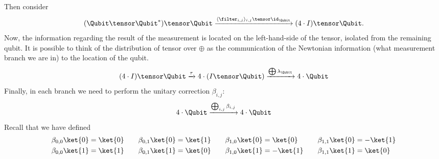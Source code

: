 Then consider
\[  (\Qubit \tensor \Qubit^*) \tensor \Qubit
    \xrightarrow{\langle \filter_{i,j} \rangle_{i,j} \tensor \id_\Qubit} 
    (4 \cdot I) \tensor \Qubit. 
\]
Now, the information regarding the result of the measurement is located on the left-hand-side of the tensor,
isolated from the remaining qubit. It is possible to think of the distribution of
tensor over $\oplus$ as the communication of the Newtonian information (what measurement
branch we are in) to the location of the qubit. 
\[
    (4 \cdot I) \tensor \Qubit
    \xrightarrow{ \tau }
    4 \cdot (I \tensor \Qubit) 
    \xrightarrow{ \bigoplus \lambda_\Qubit}
    4 \cdot \Qubit
\]
Finally, in each branch we need to perform the unitary correction $\beta_{i,j}$:
\[
    4 \cdot \Qubit
    \xrightarrow{ \bigoplus_{i,j} \beta_{i,j} }
    4 \cdot \Qubit
\]
Recall that we have defined
\begin{align*}
\begin{aligned}
    \beta_{0,0} \ket{0} &= \ket{0} \\
    \beta_{0,0} \ket{1} &= \ket{1} 
\end{aligned}
\qquad
\begin{aligned}
    \beta_{0,1} \ket{0} &= \ket{1} \\
    \beta_{0,1} \ket{1} &= \ket{0} 
\end{aligned}
\qquad
\begin{aligned}
    \beta_{1,0} \ket{0} &= \ket{0} \\
    \beta_{1,0} \ket{1} &= -\ket{1} 
\end{aligned}
\qquad
\begin{aligned}
    \beta_{1,1} \ket{0} &= -\ket{1} \\
    \beta_{1,1} \ket{1} &= \ket{0} 
\end{aligned}
\end{align*}

